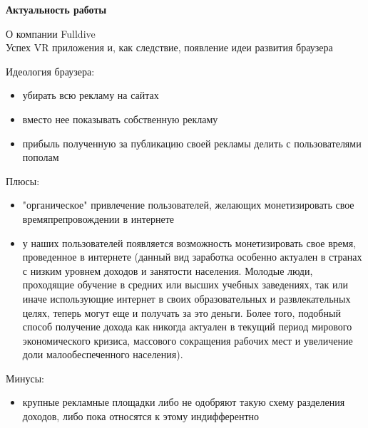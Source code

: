 \documentclass[specification,annotation,times]{itmo-student-thesis}
\begin{document}

\tableofcontents









\startprefacepage

{\large \textbf{Актуальность работы}}
\bigbreak

{\large О компании Fulldive}
\\
Успех VR приложения и, как следствие, появление идеи развития браузера
\bigbreak

{\large Идеология браузера:}
\begin{itemize}
	\item убирать всю рекламу на сайтах
	\item вместо нее показывать собственную рекламу
	\item прибыль полученную за публикацию своей рекламы делить с пользователями пополам
\end{itemize}
\bigbreak

{\large Плюсы:}
\begin{itemize}
	\item "органическое" привлечение пользователей, желающих монетизировать свое времяпрепровождении в интернете
	\item у наших пользователей появляется возможность монетизировать свое время, проведенное в интернете (данный вид заработка особенно актуален в странах с низким уровнем доходов и занятости населения. Молодые люди, проходящие обучение в средних или высших учебных заведениях, так или иначе использующие интернет в своих образовательных и развлекательных целях, теперь могут еще и получать за это деньги. Более того, подобный способ получение дохода как никогда актуален в текущий период мирового экономического кризиса, массового сокращения рабочих мест и увеличение доли малообеспеченного населения).
\end{itemize}
\bigbreak

{\large Минусы:}
\begin{itemize}
	\item крупные рекламные площадки либо не одобряют такую схему разделения доходов, либо пока относятся к этому индифферентно
\end{itemize}
\bigbreak
\end{document}
